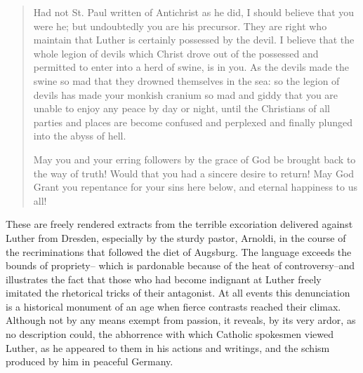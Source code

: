 \begin{quote}
Had not St. Paul written of Antichrist as he did, I should believe that you
were he; but undoubtedly you are his precursor. They are right who maintain
that Luther is certainly possessed by the devil. I believe that the whole
legion of devils which Christ drove out of the possessed and permitted to
enter into a herd of swine, is in you. As the devils made the swine so mad
that they drowned themselves in the sea: so the legion of devils has made
your monkish cranium so mad and giddy that you are unable to enjoy any
peace by day or night, until the Christians of all parties and places are become
confused and perplexed and finally plunged into the abyss of hell.

May you and your erring followers by the grace of God be brought back
to the way of truth! Would that you had a sincere desire to return! May
God Grant you repentance for your sins here below, and eternal happiness
to us all!
\end{quote}

These are freely rendered extracts from the terrible excoriation
delivered against Luther from Dresden, especially by the sturdy
pastor, Arnoldi, in the course of the recriminations that followed the
diet of Augsburg. The language exceeds the bounds of propriety--
which is pardonable because of the heat of controversy--and illustrates
the fact that those who had become indignant at Luther freely
imitated the rhetorical tricks of their antagonist. At all events this
denunciation is a historical monument of an age when fierce contrasts
reached their climax. Although not by any means exempt from
passion, it reveals, by its very ardor, as no description could, the abhorrence
with which Catholic spokesmen viewed Luther, as he appeared to them in
his actions and writings, and the schism produced
by him in peaceful Germany.
